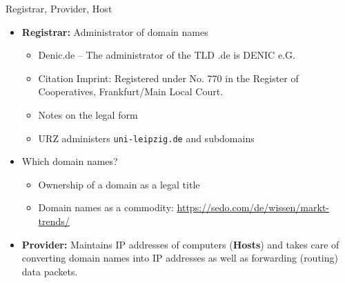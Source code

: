\documentclass{beamer}
\begin{document}
\begin{frame}{Registrar, Provider, Host}
\begin{itemize}
\item \textbf{Registrar:} Administrator of domain names
  \begin{itemize}
  \item Denic.de -- The administrator of the TLD .de is DENIC e.G.
  \item Citation Imprint: Registered under No. 770 in the Register of
    Cooperatives, Frankfurt/Main Local Court.
  \item Notes on the legal form
  \item URZ administers \texttt{uni-leipzig.de} and subdomains
  \end{itemize}
\item Which domain names?
  \begin{itemize}
  \item Ownership of a domain as a legal title
  \item Domain names as a commodity:
    \url{https://sedo.com/de/wissen/markt-trends/}
  \end{itemize}
\item \textbf{Provider:} Maintains IP addresses of computers (\textbf{Hosts})
  and takes care of converting domain names into IP addresses as well as
  forwarding (routing) data packets.
\end{itemize}
\end{frame}
\end{document}
